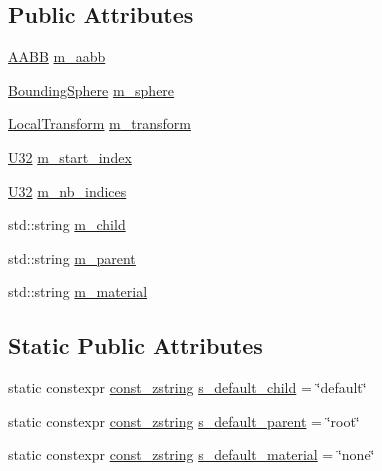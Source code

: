 \subsection*{Public Attributes}
\begin{DoxyCompactItemize}
\item 
\mbox{\hyperlink{classmage_1_1_a_a_b_b}{A\+A\+BB}} \mbox{\hyperlink{structmage_1_1rendering_1_1_model_part_a69f7f90a31e48a286fecebc9e680b5ef}{m\+\_\+aabb}}
\item 
\mbox{\hyperlink{classmage_1_1_bounding_sphere}{Bounding\+Sphere}} \mbox{\hyperlink{structmage_1_1rendering_1_1_model_part_aa2204e02fe90f993990cdda677bff6e7}{m\+\_\+sphere}}
\item 
\mbox{\hyperlink{classmage_1_1_local_transform}{Local\+Transform}} \mbox{\hyperlink{structmage_1_1rendering_1_1_model_part_af34853cb09b179bd8ffb0da151914066}{m\+\_\+transform}}
\item 
\mbox{\hyperlink{namespacemage_aa5d6eaabaac3cdd01873d6a3d27e90f3}{U32}} \mbox{\hyperlink{structmage_1_1rendering_1_1_model_part_a251d19417a0b4abe98faeae767b9fef4}{m\+\_\+start\+\_\+index}}
\item 
\mbox{\hyperlink{namespacemage_aa5d6eaabaac3cdd01873d6a3d27e90f3}{U32}} \mbox{\hyperlink{structmage_1_1rendering_1_1_model_part_a6e622f4bcb1ada388c3ee489c22e4547}{m\+\_\+nb\+\_\+indices}}
\item 
std\+::string \mbox{\hyperlink{structmage_1_1rendering_1_1_model_part_ad62194df918560d18de5e311b26eabfc}{m\+\_\+child}}
\item 
std\+::string \mbox{\hyperlink{structmage_1_1rendering_1_1_model_part_ac2e8e1a53ded91cf4e0439c15b63ab07}{m\+\_\+parent}}
\item 
std\+::string \mbox{\hyperlink{structmage_1_1rendering_1_1_model_part_abe5c6a98f2c039f2a20e9f6d1842f71b}{m\+\_\+material}}
\end{DoxyCompactItemize}
\subsection*{Static Public Attributes}
\begin{DoxyCompactItemize}
\item 
static constexpr \mbox{\hyperlink{namespacemage_abfd9206dc607ceb5d13ec68bf075a5c0}{const\+\_\+zstring}} \mbox{\hyperlink{structmage_1_1rendering_1_1_model_part_a3571b142c7948d7ab5af699799c69b42}{s\+\_\+default\+\_\+child}} = \char`\"{}default\char`\"{}
\item 
static constexpr \mbox{\hyperlink{namespacemage_abfd9206dc607ceb5d13ec68bf075a5c0}{const\+\_\+zstring}} \mbox{\hyperlink{structmage_1_1rendering_1_1_model_part_ab6747ba3fd20c9f55f1d9bb7a64033e5}{s\+\_\+default\+\_\+parent}} = \char`\"{}root\char`\"{}
\item 
static constexpr \mbox{\hyperlink{namespacemage_abfd9206dc607ceb5d13ec68bf075a5c0}{const\+\_\+zstring}} \mbox{\hyperlink{structmage_1_1rendering_1_1_model_part_a833762db3fb81dd2086e9b89da158b12}{s\+\_\+default\+\_\+material}} = \char`\"{}none\char`\"{}
\end{DoxyCompactItemize}


